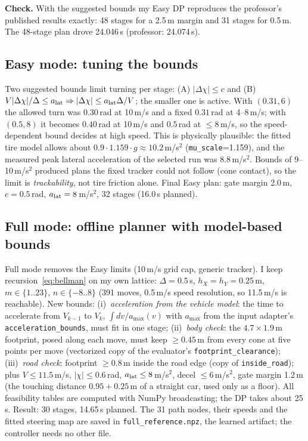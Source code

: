 \documentclass[conference]{IEEEtran}
\begin{document}
\textbf{Check.} With the suggested bounds my Easy DP reproduces the
professor's published results exactly: 48 stages for a 2.5\,m margin and 31
stages for 0.5\,m. The 48-stage plan drove 24.046\,s (professor: 24.074\,s).

\subsection{Easy mode: tuning the bounds}
Two suggested bounds limit turning per stage: (A) $|\Delta\chi|\le c$ and
(B) $V|\Delta\chi|/\Delta\le a_{\rm lat}\Rightarrow|\Delta\chi|\le
a_{\rm lat}\Delta/V$; the smaller one is active. With $(0.31,6)$ the allowed
turn was $0.30$\,rad at 10\,m/s and a fixed $0.31$\,rad at 4--8\,m/s; with
$(0.5,8)$ it becomes $0.40$\,rad at 10\,m/s and $0.5$\,rad at $\le8$\,m/s, so
the speed-dependent bound decides at high speed. This is physically plausible:
the fitted tire model allows about $0.9\cdot1.159\cdot g\approx10.2$\,m/s$^2$
(\texttt{mu\_scale}=1.159), and the measured peak lateral acceleration of the
selected run was 8.8\,m/s$^2$. Bounds of 9--10\,m/s$^2$ produced plans the
fixed tracker could not follow (cone contact), so the limit is
\emph{trackability}, not tire friction alone. Final Easy plan: gate margin
2.0\,m, $c=0.5$\,rad, $a_{\rm lat}=8$\,m/s$^2$, 32 stages (16.0\,s planned).

\subsection{Full mode: offline planner with model-based bounds}
Full mode removes the Easy limits (10\,m/s grid cap, generic tracker). I keep
recursion~\eqref{eq:bellman} on my own lattice: $\Delta=0.5$\,s,
$h_X=h_Y=0.25$\,m, $m\in\{1..23\}$, $n\in\{-8..8\}$ (391 moves, 0.5\,m/s speed
resolution, so 11.5\,m/s is reachable). New bounds:
(i)~\emph{acceleration from the vehicle model}: the time to accelerate from
$V_{k-1}$ to $V_k$, $\int dv/a_{\max}(v)$ with $a_{\max}$ from the input
adapter's \texttt{acceleration\_bounds}, must fit in one stage;
(ii)~\emph{body check}: the $4.7\times1.9$\,m footprint, posed along each move,
must keep $\ge0.45$\,m from every cone at five points per move (vectorized copy
of the evaluator's \texttt{footprint\_clearance});
(iii)~\emph{road check}: footprint $\ge0.8$\,m inside the road edge (copy of
\texttt{inside\_road}); plus $V\le11.5$\,m/s, $|\chi|\le0.6$\,rad,
$a_{\rm lat}\le8$\,m/s$^2$, decel $\le6$\,m/s$^2$, gate margin 1.2\,m (the
touching distance $0.95+0.25$\,m of a straight car, used only as a floor). All
feasibility tables are computed with NumPy broadcasting; the DP takes about
25\,s. Result: 30 stages, 14.65\,s planned. The 31 path nodes, their speeds and
the fitted steering map are saved in \texttt{full\_reference.npz}, the
learned artifact; the controller needs no other file.
\end{document}
